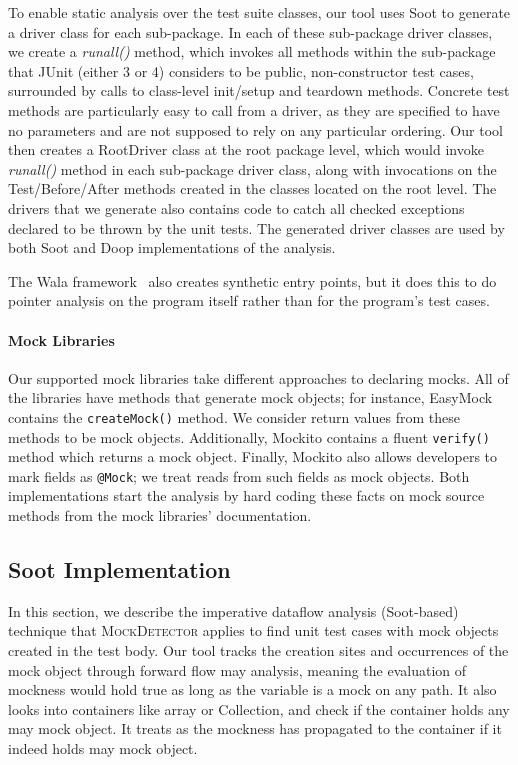 To enable static analysis over the test suite classes, our tool uses Soot to generate a driver class for each sub-package. In each of these sub-package driver classes, we create a \textit{runall()} method, which invokes all methods within the sub-package that JUnit (either 3 or 4) considers to be public, non-constructor test cases, surrounded by calls to class-level init/setup and teardown methods. Concrete test methods are particularly easy to call from a driver, as they are specified to have no parameters and are not supposed to rely on any particular ordering. 
Our tool then creates a RootDriver class at the root package level, which would invoke \textit{runall()} method in each sub-package driver class, along with invocations on the Test/Before/After methods created in the classes located on the root level. The drivers that we generate also contains code to catch all checked exceptions declared to be thrown by the unit tests. The generated driver classes are used by both Soot and Doop implementations of the analysis.

The Wala framework~\cite{wala19:_t} also creates synthetic entry points, but it does this to do pointer analysis on the program itself rather than for the program's test cases.

\paragraph{Mock Libraries}
Our supported mock libraries take different approaches to declaring mocks. All of the libraries have methods that generate mock objects; for instance, EasyMock contains the \texttt{createMock()} method. We consider return values from these methods to be mock objects. Additionally, Mockito contains a fluent \texttt{verify()} method which returns a mock object. Finally, Mockito also allows developers to mark fields as \texttt{@Mock}; we treat reads from such fields as mock objects. Both implementations start the analysis by hard coding these facts on mock source methods from the mock libraries' documentation. 

\subsection{Soot Implementation}
In this section, we describe the imperative dataflow analysis (Soot-based) technique that \textsc{MockDetector} applies to find unit test cases with mock objects created in the test body. Our tool tracks the creation sites and occurrences of the mock object through forward flow may analysis, meaning the evaluation of mockness would hold true as long as the variable is a mock on any path. It also looks into containers like array or Collection, and check if the container holds any may mock object. It treats as the mockness has propagated to the container if it indeed holds may mock object.

